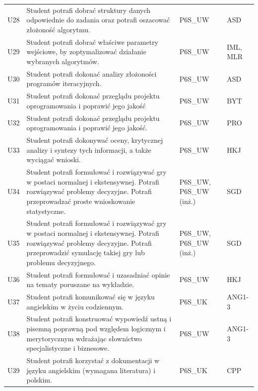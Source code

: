 \documentclass[12pt,a4paper]{article}
\begin{document}
{\begin{longtable}{m{1cm}m{8.8cm}m{2.1cm}m{2.5cm}}
\rowcolor{tableRowAlt} U28 & Student potrafi dobrać struktury danych odpowiednie do zadania oraz potrafi oszacować złożoność algorytmu. & {\scriptsize P6S\_UW} & {\scriptsize ASD} \\
\rowcolor{tableRowLight} U29 & Student potrafi dobrać właściwe parametry wejściowe, by zoptymalizować działanie wybranych algorytmów. & {\scriptsize P6S\_UW} & {\scriptsize IML, MLR} \\
\rowcolor{tableRowAlt} U30 & Student potrafi dokonać analizy złożoności programów iteracyjnych. & {\scriptsize P6S\_UW} & {\scriptsize ASD} \\
\rowcolor{tableRowLight} U31 & Student potrafi dokonać przeglądu projektu oprogramowania i poprawić jego jakość & {\scriptsize P6S\_UW} & {\scriptsize BYT} \\
\rowcolor{tableRowAlt} U32 & Student potrafi dokonać przeglądu projektu oprogramowania i poprawić jego jakość. & {\scriptsize P6S\_UW} & {\scriptsize PRO} \\
\rowcolor{tableRowLight} U33 & Student potrafi dokonywać oceny, krytycznej analizy i syntezy tych informacji, a także wyciągać wnioski. & {\scriptsize P6S\_UW} & {\scriptsize HKJ} \\
\rowcolor{tableRowAlt} U34 & Student potrafi formułować i rozwiązywać gry w postaci normalnej i ekstensywnej. Potrafi rozwiązywać problemy decyzyjne. Potrafi przeprowadzać proste wnioskowanie statystyczne. & {\scriptsize P6S\_UW, P6S\_UW {\scriptsize (inż.)}} & {\scriptsize SGD} \\
\rowcolor{tableRowLight} U35 & Student potrafi formułować i rozwiązywać gry w postaci normalnej i ekstensywnej. Potrafi rozwiązywać problemy decyzyjne. Potrafi przeprowadzić symulację takiej gry lub problemu decyzyjnego. & {\scriptsize P6S\_UW, P6S\_UW {\scriptsize (inż.)}} & {\scriptsize SGD} \\
\rowcolor{tableRowAlt} U36 & Student potrafi formułować i uzasadniać opinie na tematy poruszane na wykładzie. & {\scriptsize P6S\_UW} & {\scriptsize HKJ} \\
\rowcolor{tableRowLight} U37 & Student potrafi komunikować się w języku angielskim w życiu codziennym. & {\scriptsize P6S\_UK} & {\scriptsize ANG1-3} \\
\rowcolor{tableRowAlt} U38 & Student potrafi konstruować wypowiedź ustną i pisemną poprawną pod względem logicznym i merytorycznym wdrażając słownictwo specjalistyczne i biznesowe. & {\scriptsize P6S\_UW} & {\scriptsize ANG1-3} \\
\rowcolor{tableRowLight} U39 & Student potrafi korzystać z dokumentacji w języku angielskim (wymagana literatura) i polskim. & {\scriptsize P6S\_UK} & {\scriptsize CPP} \\

\end{longtable}}
\end{document}
